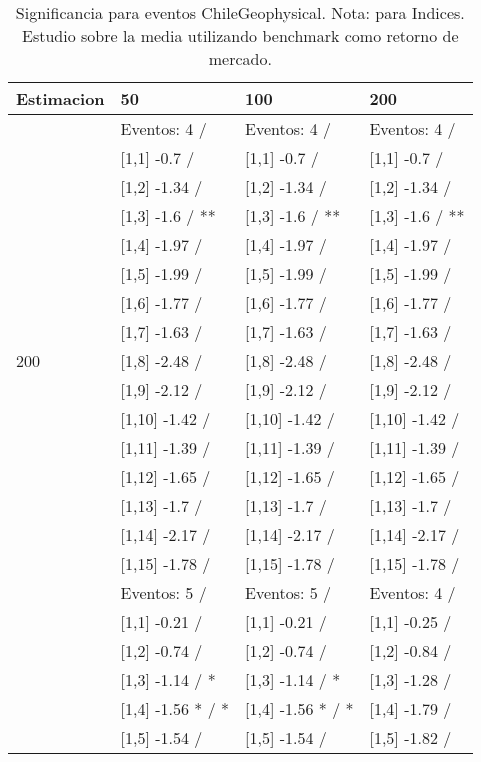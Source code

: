 \begin{table}

\caption{Significancia para eventos ChileGeophysical. Nota: para Indices. Estudio sobre la media utilizando benchmark como retorno de mercado.}
\centering
\begin{tabular}[t]{llll}
\toprule
Estimacion & 50 & 100 & 200\\
\midrule
 & Eventos:  4 / & Eventos:  4 / & Eventos:  4 /\\
 & {}[1,1] -0.7  / & {}[1,1] -0.7  / & {}[1,1] -0.7  /\\
 & {}[1,2] -1.34  / & {}[1,2] -1.34  / & {}[1,2] -1.34  /\\
 & {}[1,3] -1.6  / ** & {}[1,3] -1.6  / ** & {}[1,3] -1.6  / **\\
 & {}[1,4] -1.97  / & {}[1,4] -1.97  / & {}[1,4] -1.97  /\\
\addlinespace
 & {}[1,5] -1.99  / & {}[1,5] -1.99  / & {}[1,5] -1.99  /\\
 & {}[1,6] -1.77  / & {}[1,6] -1.77  / & {}[1,6] -1.77  /\\
 & {}[1,7] -1.63  / & {}[1,7] -1.63  / & {}[1,7] -1.63  /\\
200 & {}[1,8] -2.48  / & {}[1,8] -2.48  / & {}[1,8] -2.48  /\\
 & {}[1,9] -2.12  / & {}[1,9] -2.12  / & {}[1,9] -2.12  /\\
\addlinespace
 & {}[1,10] -1.42  / & {}[1,10] -1.42  / & {}[1,10] -1.42  /\\
 & {}[1,11] -1.39  / & {}[1,11] -1.39  / & {}[1,11] -1.39  /\\
 & {}[1,12] -1.65  / & {}[1,12] -1.65  / & {}[1,12] -1.65  /\\
 & {}[1,13] -1.7  / & {}[1,13] -1.7  / & {}[1,13] -1.7  /\\
 & {}[1,14] -2.17  / & {}[1,14] -2.17  / & {}[1,14] -2.17  /\\
\addlinespace
 & {}[1,15] -1.78  / & {}[1,15] -1.78  / & {}[1,15] -1.78  /\\
 & Eventos:  5 / & Eventos:  5 / & Eventos:  4 /\\
 & {}[1,1] -0.21  / & {}[1,1] -0.21  / & {}[1,1] -0.25  /\\
 & {}[1,2] -0.74  / & {}[1,2] -0.74  / & {}[1,2] -0.84  /\\
 & {}[1,3] -1.14  / * & {}[1,3] -1.14  / * & {}[1,3] -1.28  /\\
\addlinespace
 & {}[1,4] -1.56 * / * & {}[1,4] -1.56 * / * & {}[1,4] -1.79  /\\
 & {}[1,5] -1.54  / & {}[1,5] -1.54  / & {}[1,5] -1.82  /\\

\end{tabular}
\end{table}

